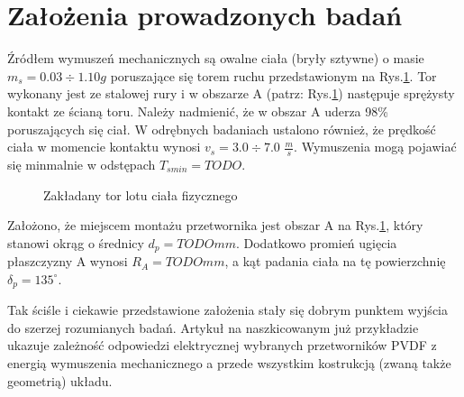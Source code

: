 \section{Założenia prowadzonych badań}
\label{sec:assumptions}

Źródłem wymuszeń mechanicznych są owalne ciała (bryły sztywne) o masie $m_s=0.03\div1.10 g$ poruszające się torem ruchu przedstawionym na Rys.\ref{fig:route}. Tor wykonany jest ze stalowej rury i w obszarze A (patrz: Rys.\ref{fig:route}) następuje sprężysty kontakt ze ścianą toru. Należy nadmienić, że w obszar A uderza 98\% poruszających się ciał. W odrębnych badaniach ustalono również, że prędkość ciała w momencie kontaktu wynosi $v_s=3.0\div7.0$ $\frac{m}{s}$. Wymuszenia mogą pojawiać się minmalnie w odstępach $T_{smin}=TODO$.

\begin{figure}[htbp]
\centering
{}%
\caption{Zakładany tor lotu ciała fizycznego}
\label{fig:route}
\end{figure}

Założono, że miejscem montażu przetwornika jest obszar A na Rys.\ref{fig:route}, który stanowi okrąg o średnicy $d_p=TODO mm$. Dodatkowo promień ugięcia płaszczyzny A wynosi $R_A=TODOmm$, a kąt padania ciała na tę powierzchnię $\delta_p=135^{\circ}$. 

Tak ściśle i ciekawie przedstawione założenia stały się dobrym punktem wyjścia do szerzej rozumianych badań. Artykuł na naszkicowanym już przykładzie ukazuje zależność odpowiedzi elektrycznej wybranych przetworników PVDF z energią wymuszenia mechanicznego a przede wszystkim kostrukcją (zwaną także geometrią) układu.